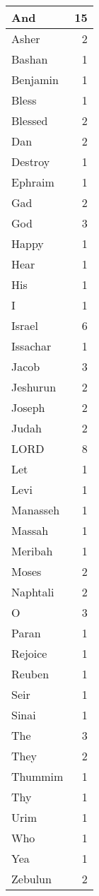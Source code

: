 \begin{center}
\begin{longtable}{l|r}
\hline \hline
\endlastfoot
And & 15 \\ \hline
Asher & 2 \\ \hline
Bashan & 1 \\ \hline
Benjamin & 1 \\ \hline
Bless & 1 \\ \hline
Blessed & 2 \\ \hline
Dan & 2 \\ \hline
Destroy & 1 \\ \hline
Ephraim & 1 \\ \hline
Gad & 2 \\ \hline
God & 3 \\ \hline
Happy & 1 \\ \hline
Hear & 1 \\ \hline
His & 1 \\ \hline
I & 1 \\ \hline
Israel & 6 \\ \hline
Issachar & 1 \\ \hline
Jacob & 3 \\ \hline
Jeshurun & 2 \\ \hline
Joseph & 2 \\ \hline
Judah & 2 \\ \hline
LORD & 8 \\ \hline
Let & 1 \\ \hline
Levi & 1 \\ \hline
Manasseh & 1 \\ \hline
Massah & 1 \\ \hline
Meribah & 1 \\ \hline
Moses & 2 \\ \hline
Naphtali & 2 \\ \hline
O & 3 \\ \hline
Paran & 1 \\ \hline
Rejoice & 1 \\ \hline
Reuben & 1 \\ \hline
Seir & 1 \\ \hline
Sinai & 1 \\ \hline
The & 3 \\ \hline
They & 2 \\ \hline
Thummim & 1 \\ \hline
Thy & 1 \\ \hline
Urim & 1 \\ \hline
Who & 1 \\ \hline
Yea & 1 \\ \hline
Zebulun & 2 \\ \hline

\end{longtable}
\end{center}
